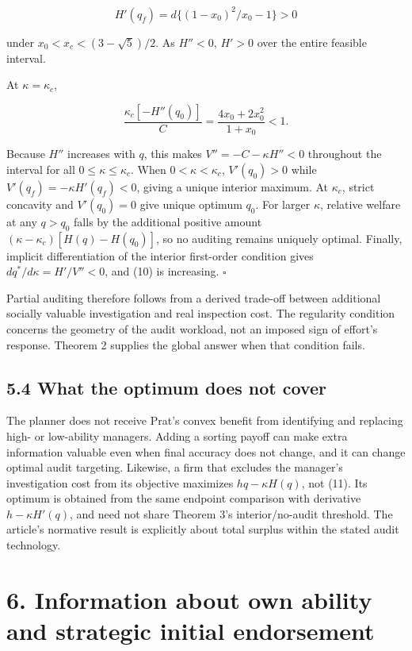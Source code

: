 \documentclass[
  11pt,
]{article}
\begin{document}
\[H'(q_f)=d\{(1-x_0)^2/x_0-1\}>0\]

under \(x_0<x_c<(3-\sqrt5)/2\). As \(H''<0\), \(H'>0\) over the entire
feasible interval.

At \(\kappa=\kappa_c\),

\[\frac{\kappa_c[-H''(q_0)]}{C}=\frac{4x_0+2x_0^2}{1+x_0}<1.\tag{15}\]

Because \(H''\) increases with \(q\), this makes \(V''=-C-\kappa H''<0\)
throughout the interval for all \(0\leq\kappa\leq\kappa_c\). When
\(0<\kappa<\kappa_c\), \(V'(q_0)>0\) while
\(V'(q_f)=-\kappa H'(q_f)<0\), giving a unique interior maximum. At
\(\kappa_c\), strict concavity and \(V'(q_0)=0\) give unique optimum
\(q_0\). For larger \(\kappa\), relative welfare at any \(q>q_0\) falls
by the additional positive amount \((\kappa-\kappa_c)[H(q)-H(q_0)]\), so
no auditing remains uniquely optimal. Finally, implicit differentiation
of the interior first-order condition gives \(dq^*/d\kappa=H'/V''<0\),
and (10) is increasing. \(\square\)

Partial auditing therefore follows from a derived trade-off between
additional socially valuable investigation and real inspection cost. The
regularity condition concerns the geometry of the audit workload, not an
imposed sign of effort's response. Theorem 2 supplies the global answer
when that condition fails.

\subsection{5.4 What the optimum does not
cover}\label{what-the-optimum-does-not-cover}

The planner does not receive Prat's convex benefit from identifying and
replacing high- or low-ability managers. Adding a sorting payoff can
make extra information valuable even when final accuracy does not
change, and it can change optimal audit targeting. Likewise, a firm that
excludes the manager's investigation cost from its objective maximizes
\(hq-\kappa H(q)\), not (11). Its optimum is obtained from the same
endpoint comparison with derivative \(h-\kappa H'(q)\), and need not
share Theorem 3's interior/no-audit threshold. The article's normative
result is explicitly about total surplus within the stated audit
technology.

\section{6. Information about own ability and strategic initial
endorsement}\label{information-about-own-ability-and-strategic-initial-endorsement}
\end{document}

